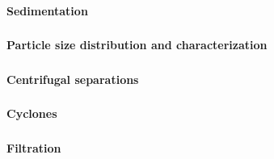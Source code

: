 \begin{frame}\frametitle{}
	\begin{center}
		{\LARGE \textbf{Sedimentation}}
	\end{center}
\end{frame}


\begin{frame}\frametitle{}
	\begin{center}
		{\LARGE\textbf{Particle size distribution and characterization}}
	\end{center}
\end{frame}


\begin{frame}\frametitle{}
	\begin{center}
		{\LARGE \textbf{Centrifugal separations}}
	\end{center}
\end{frame}


\begin{frame}\frametitle{}
	\begin{center}
		{\LARGE \textbf{Cyclones}}
	\end{center}
\end{frame}



\begin{frame}\frametitle{}
	\begin{center}
		{\LARGE \textbf{Filtration}}
	\end{center}
\end{frame}


